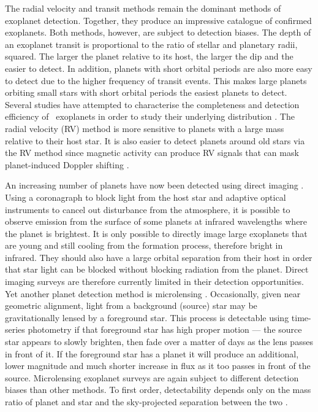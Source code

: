 The radial velocity and transit methods remain the dominant methods of
exoplanet detection.
Together, they produce an impressive catalogue of confirmed exoplanets.
Both methods, however, are subject to detection biases.
The depth of an exoplanet transit is proportional to the ratio of stellar and
planetary radii, squared.
The larger the planet relative to its host, the larger the dip and the easier
to detect.
In addition, planets with short orbital periods are also more easy to detect
due to the higher frequency of transit events.
This makes large planets orbiting small stars with short orbital periods the
easiest planets to detect.
Several studies have attempted to characterise the completeness and detection
efficiency of \kepler\ exoplanets in order to study their underlying
distribution \citep[\eg][]{Petigura2013, Foreman-Mackey2014,
Burke2015, Dressing2015}.
The radial velocity (RV) method is more sensitive to planets with a large mass
relative to their host star.
It is also easier to detect planets around old stars via the RV method since
magnetic activity can produce RV signals that can mask planet-induced Doppler
shifting \citep[\eg][]{Saar1997, Wright2005, Aigrain_2012, Rajpaul2015,
Rajpaul2016}.

An increasing number of planets have now been detected using direct imaging
\citep[\eg][]{Kalas2008, Nielsen2013}.
Using a coronagraph to block light from the host star and adaptive optical
instruments to cancel out disturbance from the atmosphere, it is possible to
observe emission from the surface of some planets at infrared wavelengths
where the planet is brightest.
It is only possible to directly image large exoplanets that are young and
still cooling from the formation process, therefore bright in infrared.
They should also have a large orbital separation from their host in order that
star light can be blocked without blocking radiation from the planet.
Direct imaging surveys are therefore currently limited in their detection
opportunities.
Yet another planet detection method is microlensing \citep[\eg][]{Abe2004,
Gould2010, Cassan2012, Gaudi2012}.
Occasionally, given near geometric alignment, light from a background (source)
star may be gravitationally lensed by a foreground star.
This process is detectable using time-series photometry if that foreground
star has high proper motion --- the source star appears to slowly brighten,
then fade over a matter of days as the lens passes in front of it.
If the foreground star has a planet it will produce an additional, lower
magnitude and much shorter increase in flux as it too passes in front of the
source.
Microlensing exoplanet surveys are again subject to different detection
biases than other methods.
To first order, detectability depends only on the mass ratio of planet and
star and the sky-projected separation between the two \citep{Clanton2016}.

